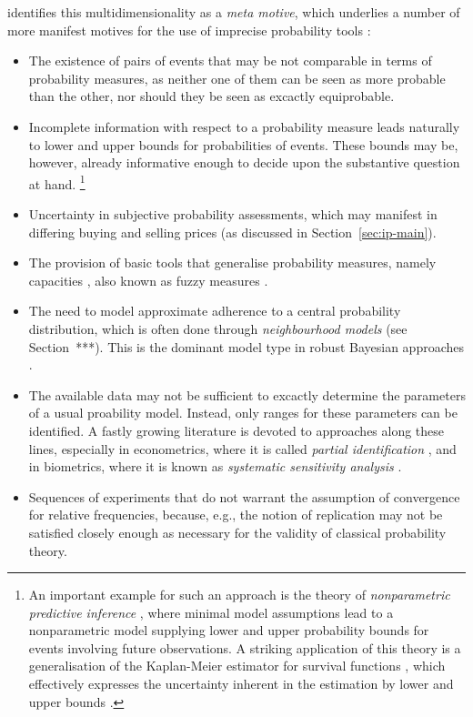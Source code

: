 \textcite[\S 1.4]{2001:weichselberger} identifies this multidimensionality as a \emph{meta motive},
which underlies a number of more manifest motives for the use of imprecise probability tools
\parencite[p~92]{2001:weichselberger}:
\begin{itemize}
\item The existence of pairs of events that may be not comparable in terms of probability measures,
as neither one of them can be seen as more probable than the other,
nor should they be seen as excactly equiprobable.
\item Incomplete information with respect to a probability measure
leads naturally to lower and upper bounds for probabilities of events.
These bounds may be, however, already informative enough to decide upon
the substantive question at hand.%
\footnote{An important example for such an approach is the theory of \emph{nonparametric predictive inference}
\parencite[NPI, see ][]{2011:IESS-npi}, where minimal model assumptions %
lead to a nonparametric model supplying lower and upper probability bounds for events
involving future observations.
A striking application of this theory is a generalisation of the
Kaplan-Meier estimator for survival functions \parencite{1958:kaplan},
which effectively expresses the uncertainty inherent in the estimation
by lower and upper bounds \parencite{2004:Coolen:Yan}.}
\item Uncertainty in subjective probability assessments,
which may manifest in differing buying and selling prices
(as discussed in Section~\ref{sec:ip-main}).
\item The provision of basic tools that generalise probability measures,
namely capacities \parencite{1954:choquet}, also known as fuzzy measures \parencite[e.g.,][]{1989:murofushi}.
\item The need to model approximate adherence to a central probability distribution,
which is often done through \emph{neighbourhood models} (see Section~***).
This is the dominant model type in robust Bayesian approaches \parencite[see, e.g.,][]{1994:berger}.
\item The available data may not be sufficient to excactly determine the parameters of a usual proability model.
Instead, only ranges for these parameters can be identified.
A fastly growing literature is devoted to approaches along these lines,
especially in econometrics, where it is called \emph{partial identification} \parencite[e.g.,][]{2003:manski},
and in biometrics, where it is known as \emph{systematic sensitivity analysis} \parencite[e.g.,][]{vansteelandt2006}.
\item Sequences of experiments that do not warrant the assumption of convergence
for relative frequencies, because, e.g., the notion of replication may not be
satisfied closely enough as necessary for the validity of classical probability theory.
\end{itemize}

